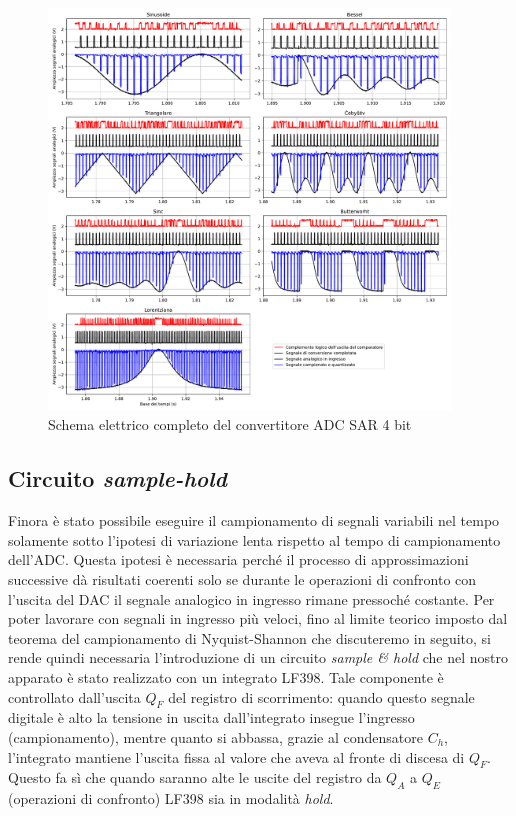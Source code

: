 \documentclass[journal]{IEEEtran}
\begin{document}
\begin{figure}[t]%
\centering
\includegraphics[trim = {30 0 50 0}, width=0.95\textwidth]{analysis/output/waveforms.pdf}
\caption{Schema elettrico completo del convertitore ADC SAR 4 bit}
\label{fig:waveforms_no_sh_scope}
\end{figure}



\subsection{Circuito \textit{sample-hold}}
Finora è stato possibile eseguire il campionamento di segnali variabili nel tempo solamente sotto l'ipotesi di variazione lenta rispetto al tempo di campionamento dell'ADC. Questa ipotesi è necessaria perché il processo di approssimazioni successive dà risultati coerenti solo se durante le operazioni di confronto con l'uscita del DAC il segnale analogico in ingresso rimane pressoché costante. Per poter lavorare con segnali in ingresso più veloci, fino al limite teorico imposto dal teorema del campionamento di Nyquist-Shannon che discuteremo in seguito, si rende quindi necessaria l'introduzione di un circuito \textit{sample \& hold} che nel nostro apparato è stato realizzato con un integrato LF398. Tale componente è controllato dall'uscita $Q_F$ del registro di scorrimento: quando questo segnale digitale è alto la tensione in uscita dall'integrato insegue l'ingresso (campionamento), mentre quanto si abbassa, grazie al condensatore $C_h$, l'integrato mantiene l'uscita fissa al valore che aveva al fronte di discesa di $Q_F$. Questo fa sì che quando saranno alte le uscite del registro da $Q_A$ a $Q_E$ (operazioni di confronto) LF398 sia in modalità \textit{hold}.
\end{document}
